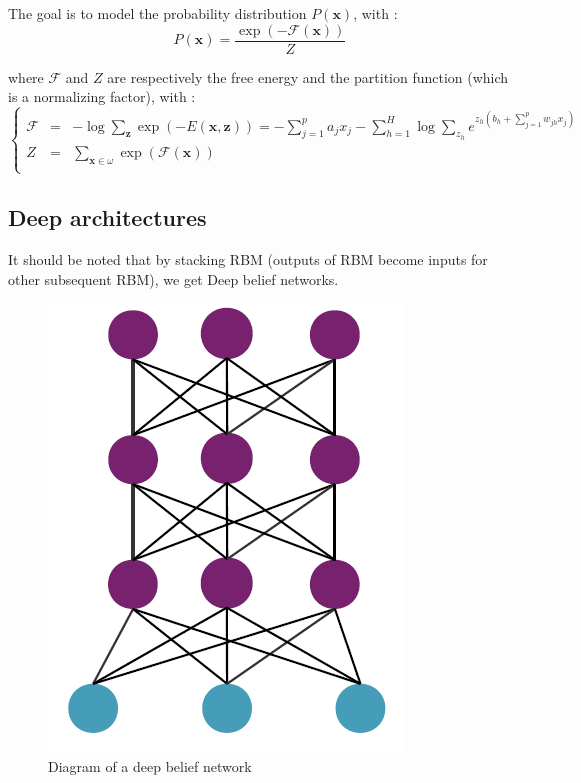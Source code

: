 \documentclass{article}
\begin{document}
The goal is to model the probability distribution $P(\textbf{x})$, with : \[P(\textbf{x}) = \frac{\exp(-\mathcal{F}(\textbf{x}))}{Z}\]

where $\mathcal{F}$ and $Z$ are respectively the free energy and the partition function (which is a normalizing factor), with :
\[ 
\left\{
  \begin{array}{rcc}
    \mathcal{F} & = & - \log\sum\limits_{\textbf{z}}\exp(-E(\textbf{x},\textbf{z})) = - \sum\limits_{j=1}^p a_jx_j - \sum\limits_{h=1}^H\log\sum\limits_{z_h}e^{z_h(b_h+\sum_{j=1}^pw_{jh}x_j)}\\
    Z & = & \sum\limits_{\textbf{x}\in\omega}\exp(\mathcal{F}(\textbf{x}))\\
  \end{array}
\right.
\]

\subsection{Deep architectures}
It should be noted that by stacking RBM (outputs of RBM become inputs for other subsequent RBM), we get Deep belief networks.

\begin{figure}[!h]
    \center
    \includegraphics[scale=0.5]{./figures/autoencoder_deepbelief.png}
    \caption{Diagram of a deep belief network}
\end{figure}
\end{document}
